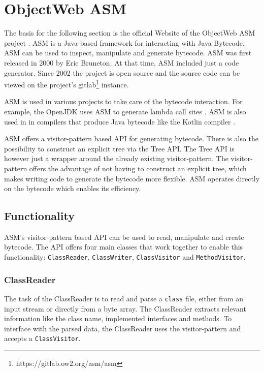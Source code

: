 \section{ObjectWeb ASM}

The basis for the following section is the official Website of the ObjectWeb ASM project \parencite{ASMWeb2024}. ASM is a Java-based framework for interacting with Java Bytecode. ASM can be used to inspect, manipulate and generate bytecode. ASM was first released in 2000 by Eric Bruneton. At that time, ASM included just a code generator. Since 2002 the project is open source and the source code can be viewed on the project's gitlab\footnote{https://gitlab.ow2.org/asm/asm} instance. 

ASM is used in various projects to take care of the bytecode interaction. For example, the OpenJDK uses ASM to generate lambda call sites \cite{OpenJdk2024}. ASM is also used in in compilers that produce Java bytecode like the Kotlin compiler \cite{Kotlin2024}. 

ASM offers a visitor-pattern based API for generating bytecode. There is also the possibility to construct an explicit tree via the Tree API. The Tree API is however just a wrapper around the already existing visitor-pattern. The visitor-pattern offers the advantage of not having to construct an explicit tree, which makes writing code to generate the bytecode more flexible. ASM operates directly on the bytecode which enables its efficiency.     

\subsection{Functionality}

ASM's visitor-pattern based API can be used to read, manipulate and create bytecode. The API offers four main classes that work together to enable this functionality: \texttt{ClassReader}, \texttt{ClassWriter}, \texttt{ClassVisitor} and \texttt{MethodVisitor}. 

\subsubsection{ClassReader}

The task of the ClassReader is to read and parse a \texttt{class} file, either from an input stream or directly from a byte array. The ClassReader extracts relevant information like the class name, implemented interfaces and methods. To interface with the parsed data, the ClassReader uses the visitor-pattern and accepts a \texttt{ClassVisitor}. 

